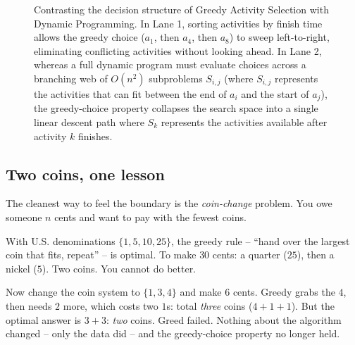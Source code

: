 \begin{figure}[h]
\caption{Contrasting the decision structure of Greedy Activity Selection with Dynamic Programming. In Lane 1, sorting activities by finish time allows the greedy choice ($a_1$, then $a_4$, then $a_8$) to sweep left-to-right, eliminating conflicting activities without looking ahead. In Lane 2, whereas a full dynamic program must evaluate choices across a branching web of $O(n^2)$ subproblems $S_{i,j}$ (where $S_{i,j}$ represents the activities that can fit between the end of $a_i$ and the start of $a_j$), the greedy-choice property collapses the search space into a single linear descent path where $S_k$ represents the activities available after activity $k$ finishes.}
\label{ch16:fig-greedy-vs-dp-activity}
\end{figure}

\subsection{Two coins, one lesson}

The cleanest way to feel the boundary is the \emph{coin-change} problem. You owe
someone $n$ cents and want to pay with the fewest coins.

With U.S. denominations $\{1, 5, 10, 25\}$, the greedy rule -- ``hand over the
largest coin that fits, repeat'' -- is optimal. To make $30$ cents: a quarter
($25$), then a nickel ($5$). Two coins. You cannot do better.

Now change the coin system to $\{1, 3, 4\}$ and make $6$ cents. Greedy grabs the
$4$, then needs $2$ more, which costs two $1$s: total \emph{three} coins
($4+1+1$). But the optimal answer is $3+3$: \emph{two} coins. Greed failed.
Nothing about the algorithm changed -- only the data did -- and the greedy-choice
property no longer held.

